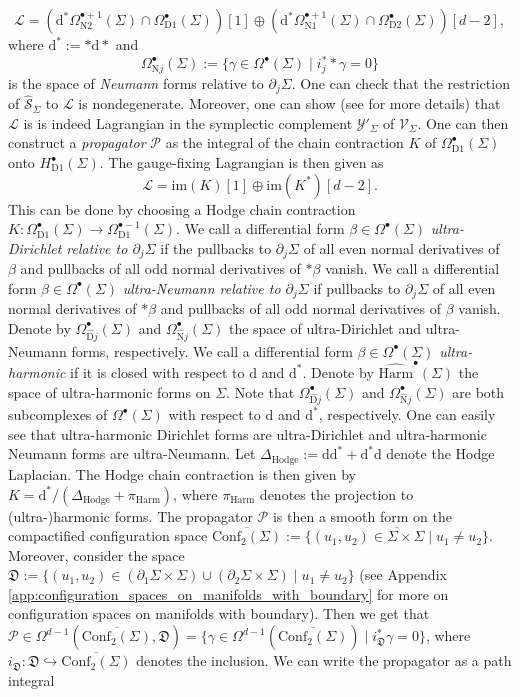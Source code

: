 \documentclass[11pt,colorinlistoftodos]{amsart}
\numberwithin{equation}{subsection}
\theoremstyle{plain}
\theoremstyle{definition}
\theoremstyle{remark}
\newcommand{\calY}{\mathcal{Y}}
\newcommand{\dd}{{\mathrm{d}}}
\newcommand{\de}{\partial}
\newcommand{\calS}{\mathcal{S}}
\newcommand{\calL}{\mathcal{L}}
\newcommand{\calV}{\mathcal{V}}
\begin{document}
\[
\calL=(\dd^*\Omega^{\bullet+1}_{\mathrm{N}2}(\Sigma)\cap\Omega^\bullet_{\mathrm{D}1}(\Sigma))[1]\oplus (\dd^*\Omega^{\bullet+1}_{\mathrm{N}1}(\Sigma)\cap\Omega^\bullet_{\mathrm{D}2}(\Sigma))[d-2],
\]
where $\dd^*:=*\dd*$ and 
\[
\Omega^\bullet_{\mathrm{N}j}(\Sigma):=\{\gamma\in\Omega^\bullet(\Sigma)\mid i^*_j*\gamma=0\}
\]
is the space of \emph{Neumann} forms relative to $\de_j\Sigma$. One can check that the restriction of $\widehat{\calS}_\Sigma$ to $\calL$ is nondegenerate. Moreover, one can show (see \cite{CMR2} for more details) that $\calL$ is is indeed Lagrangian in the symplectic complement $\calY'_\Sigma$ of $\calV_\Sigma$. One can then construct a \emph{propagator} $\mathscr{P}$ as the integral of the chain contraction $K$ of $\Omega^\bullet_{\mathrm{D}1}(\Sigma)$ onto $H^\bullet_{\mathrm{D}1}(\Sigma)$. The gauge-fixing Lagrangian is then given as 
\[
\calL=\mathrm{im}(K)[1]\oplus\mathrm{im}(K^*)[d-2].
\]
This can be done by choosing a Hodge chain contraction $K\colon \Omega^\bullet_{\mathrm{D}1}(\Sigma)\to \Omega^{\bullet-1}_{\mathrm{D}1}(\Sigma)$. We call a differential form $\beta\in \Omega^\bullet(\Sigma)$ \emph{ultra-Dirichlet relative to $\de_j\Sigma$} if the pullbacks to $\de_j\Sigma$ of all even normal derivatives of $\beta$ and pullbacks of all odd normal derivatives of $*\beta$ vanish. We call a differential form $\beta\in\Omega^\bullet(\Sigma)$ \emph{ultra-Neumann relative to $\de_j\Sigma$} if pullbacks to $\de_j\Sigma$ of all even normal derivatives of $*\beta$ and pullbacks of all odd normal derivatives of $\beta$ vanish. Denote by $\Omega^\bullet_{\widehat{\mathrm{D}}j}(\Sigma)$ and $\Omega^\bullet_{\widehat{\mathrm{N}}j}(\Sigma)$ the space of ultra-Dirichlet and ultra-Neumann forms, respectively. We call a differential form $\beta\in \Omega^\bullet(\Sigma)$ \emph{ultra-harmonic} if it is closed with respect to $\dd$ and $\dd^*$. Denote by $\widehat{\mathrm{Harm}}^\bullet(\Sigma)$ the space of ultra-harmonic forms on $\Sigma$. Note that $\Omega^\bullet_{\widehat{\mathrm{D}}j}(\Sigma)$ and $\Omega^\bullet_{\widehat{\mathrm{N}}j}(\Sigma)$ are both subcomplexes of $\Omega^\bullet(\Sigma)$ with respect to $\dd$ and $\dd^*$, respectively. One can easily see that ultra-harmonic Dirichlet forms are ultra-Dirichlet and ultra-harmonic Neumann forms are ultra-Neumann.
Let $\Delta_\mathrm{Hodge}:=\dd\dd^*+\dd^*\dd$ denote the Hodge Laplacian.
The Hodge chain contraction is then given by $K=\dd^*/(\Delta_\mathrm{Hodge}+\pi_{\mathrm{Harm}})$, where $\pi_\mathrm{Harm}$ denotes the projection to (ultra-)harmonic forms. The propagator $\mathscr{P}$ is then a smooth form on the compactified configuration space $\overline{\mathrm{Conf}_2(\Sigma)}:=\overline{\{(u_1,u_2)\in\Sigma\times\Sigma\mid u_1\not=u_2\}}$. Moreover, consider the space $\mathfrak{D}:=\{(u_1,u_2)\in (\de_1\Sigma\times \Sigma)\cup(\de_2\Sigma\times \Sigma)\mid u_1\not=u_2\}$ (see Appendix \ref{app:configuration_spaces_on_manifolds_with_boundary} for more on configuration spaces on manifolds with boundary). Then we get that $\mathscr{P}\in\Omega^{d-1}(\overline{\mathrm{Conf}_{2}(\Sigma)},\mathfrak{D})=\{\gamma\in \Omega^{d-1}(\overline{\mathrm{Conf}_2(\Sigma)})\mid i^*_\mathfrak{D}\gamma=0\}$, where $i_\mathfrak{D}\colon \mathfrak{D}\hookrightarrow \overline{\mathrm{Conf}_2(\Sigma)}$ denotes the inclusion. We can write the propagator as a path integral 
\end{document}
